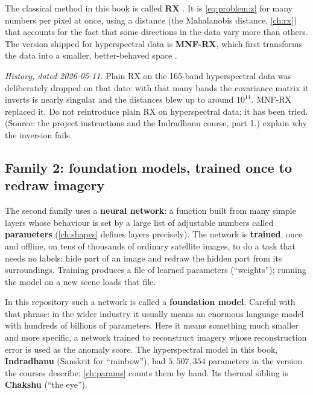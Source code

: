 The classical method in this book is called \textbf{RX}
\citep{reed1990adaptive}. It is \cref{eq:problem:z} for many numbers per pixel at once, using a
distance (the Mahalanobis distance, \cref{ch:rx}) that accounts for the fact that some directions
in the data vary more than others. The version shipped for hyperspectral data is
\textbf{MNF-RX}, which first transforms the data into a smaller, better-behaved
space \citep{green1988transformation}.

\begin{drift}
\emph{History, dated 2026-05-11.} Plain RX on the 165-band hyperspectral data was deliberately
dropped on that date: with that many bands the covariance matrix it inverts is nearly singular
and the distances blew up to around $10^{11}$. MNF-RX replaced it. Do not reintroduce plain RX on
hyperspectral data; it has been tried. (Source: the project instructions  and the
Indradhanu course, part 1.)  explain why the inversion fails.
\end{drift}

\subsection{Family 2: foundation models, trained once to redraw imagery}

The second family uses a \textbf{neural network}: a function built from
many simple layers whose behaviour is set by a large list of adjustable numbers called
\textbf{parameters} (\cref{ch:shapes} defines layers precisely). The network is
\textbf{trained}, once and offline, on tens of thousands of ordinary satellite images, to do a
task that needs no labels: hide part of an image and redraw the hidden part from its
surroundings. Training produces a file of learned parameters (``weights''); running the model on
a new scene loads that file.

In this repository such a network is called a \textbf{foundation model}.
Careful with that phrase: in the wider industry it usually means an enormous language model with
hundreds of billions of parameters. Here it means something much smaller and more specific, a
network trained to reconstruct imagery whose reconstruction error is used as the anomaly score.
The hyperspectral model in this book, \textbf{Indradhanu} (Sanskrit for
``rainbow''), had $5{,}507{,}354$ parameters in the
version the courses describe; \cref{ch:params} counts them by hand. Its thermal sibling is
\textbf{Chakshu} (``the eye'').

